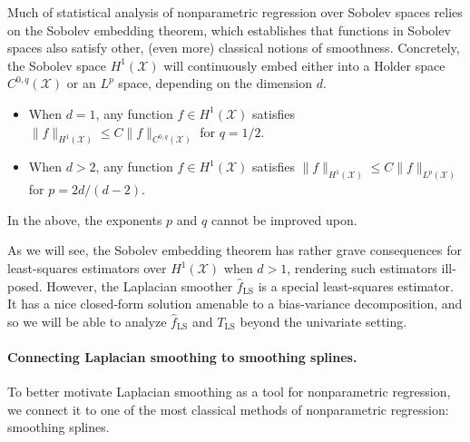 \documentclass{article}
\newcommand{\1}{\mathbf{1}}
\newcommand{\Xset}{\mathcal{X}}
\newcommand{\Leb}{L}
\newcommand{\wh}[1]{\widehat{#1}}
\newcommand{\LS}{\mathrm{LS}}
\theoremstyle{alden}
\theoremstyle{aldenthm}
\theoremstyle{definition}
\theoremstyle{remark}
\begin{document}
Much of statistical analysis of nonparametric regression over Sobolev spaces relies on the Sobolev embedding theorem, which establishes that functions in Sobolev spaces also satisfy other, (even more) classical notions of smoothness. Concretely, the Sobolev space $H^1(\Xset)$ will continuously embed either into a Holder space $C^{0,q}(\Xset)$ or an $\Leb^p$ space, depending on the dimension $d$.
\begin{itemize}
	\item When $d = 1$, any function $f \in H^1(\Xset)$ satisfies $\|f\|_{H^1(\Xset)} \leq C\|f\|_{C^{0,q}(\Xset)}$ for $q = 1/2.$
	\item When $d > 2$, any function $f \in H^1(\Xset)$ satisfies $\|f\|_{H^1(\Xset)} \leq C\|f\|_{\Leb^{p}(\Xset)}$ for $p = 2d/(d - 2)$. 
\end{itemize}
In the above, the exponents $p$ and $q$ cannot be improved upon. 



As we will see, the Sobolev embedding theorem has rather grave consequences for least-squares estimators over $H^1(\Xset)$ when $d > 1$, rendering such estimators ill-posed. However, the Laplacian smoother $\wh{f}_{\LS}$ is a special least-squares estimator. It has a nice closed-form solution amenable to a bias-variance decomposition, and so we will be able to analyze $\wh{f}_{\LS}$ and $T_{\LS}$ beyond the univariate setting.

\paragraph{Connecting Laplacian smoothing to smoothing splines.} 
To better motivate Laplacian smoothing as a tool for nonparametric regression, we connect it to one of the most classical methods of nonparametric regression: smoothing splines.
\end{document}
